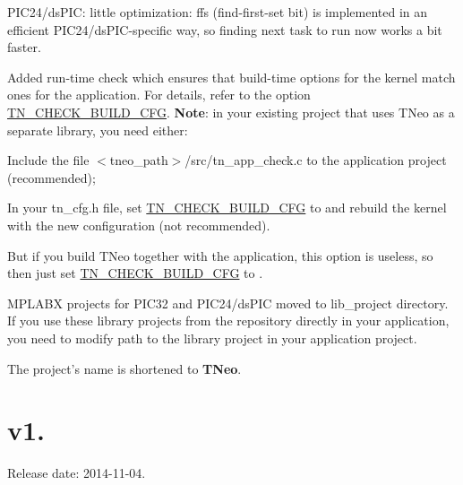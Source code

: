 \begin{DoxyItemize}
\item P\+I\+C24/ds\+P\+I\+C\+: little optimization\+: ffs (find-\/first-\/set bit) is implemented in an efficient P\+I\+C24/ds\+P\+I\+C-\/specific way, so finding next task to run now works a bit faster.
\item Added run-\/time check which ensures that build-\/time options for the kernel match ones for the application. For details, refer to the option {\ttfamily \hyperlink{tn__cfg__default_8h_aacdc913eb66492cf69cf02a5de73578e}{T\+N\+\_\+\+C\+H\+E\+C\+K\+\_\+\+B\+U\+I\+L\+D\+\_\+\+C\+F\+G}}. {\bfseries Note}\+: in your existing project that uses T\+Neo as a separate library, you need either\+:
\begin{DoxyItemize}
\item Include the file {\ttfamily $<$tneo\+\_\+path$>$/src/tn\+\_\+app\+\_\+check.c} to the application project (recommended);
\item In your {\ttfamily tn\+\_\+cfg.\+h} file, set {\ttfamily \hyperlink{tn__cfg__default_8h_aacdc913eb66492cf69cf02a5de73578e}{T\+N\+\_\+\+C\+H\+E\+C\+K\+\_\+\+B\+U\+I\+L\+D\+\_\+\+C\+F\+G}} to {} and rebuild the kernel with the new configuration (not recommended).
\end{DoxyItemize}

But if you build T\+Neo together with the application, this option is useless, so then just set {\ttfamily \hyperlink{tn__cfg__default_8h_aacdc913eb66492cf69cf02a5de73578e}{T\+N\+\_\+\+C\+H\+E\+C\+K\+\_\+\+B\+U\+I\+L\+D\+\_\+\+C\+F\+G}} to {}.
\item M\+P\+L\+A\+B\+X projects for P\+I\+C32 and P\+I\+C24/ds\+P\+I\+C moved to {\ttfamily lib\+\_\+project} directory. If you use these library projects from the repository directly in your application, you need to modify path to the library project in your application project.
\item The project's name is shortened to {\bfseries T\+Neo}.
\end{DoxyItemize}\hypertarget{changelog_changelog_v1_04}{}\section{v1.}\label{changelog_changelog_v1_04}
Release date\+: 2014-\/11-\/04.


